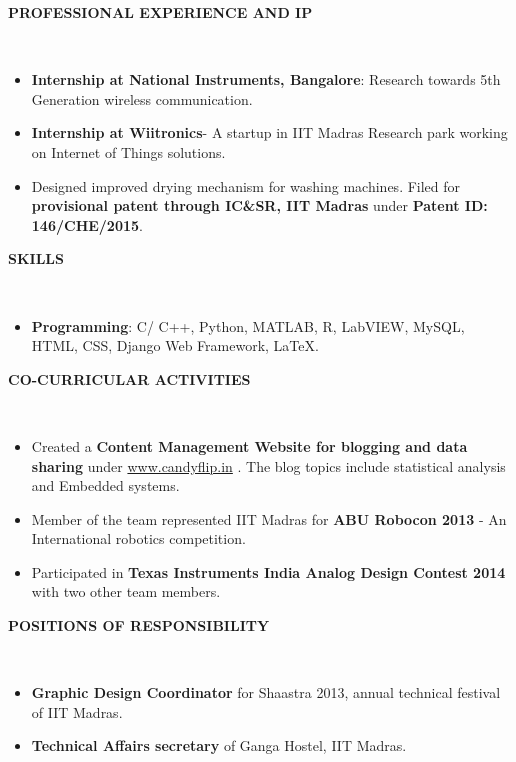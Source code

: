 \documentclass[a4paper,10pt]{article}
\newcommand{\lsep}{-0.5cm}
\newcommand{\resheading}[1]{{\small \colorbox{mygrey}{\begin{minipage}{0.975\textwidth}{\textbf{#1 \vphantom{p\^{E}}}}\end{minipage}}}}
\begin{document}
\resheading{\textbf{PROFESSIONAL EXPERIENCE AND IP} }\\[\lsep]
    \begin{itemize}
        \item \textbf{Internship at National Instruments, Bangalore}: Research towards 5th Generation wireless communication.\vspace{-5pt}        
        \item \textbf{Internship at Wiitronics}- A startup in IIT Madras Research park working on Internet of Things solutions. \vspace{-5pt}        
        \item Designed improved drying mechanism for washing machines. Filed for \textbf{provisional patent through IC\&SR, IIT Madras} under \textbf{Patent ID: 146/CHE/2015}.
    \end{itemize}
\resheading{\textbf{SKILLS} }\\[\lsep]
    \begin{itemize}
        \item \textbf{Programming}: C/ C++, Python, MATLAB, R, LabVIEW, MySQL, HTML, CSS, Django Web Framework, \LaTeX.
        \vspace{-5pt}
    \end{itemize}


\resheading{\textbf{CO-CURRICULAR ACTIVITIES} }\\[\lsep]
    \begin{itemize}
        \item Created a \textbf{Content Management Website for blogging and data sharing} under \hspace{3pt}\url{www.candyflip.in} . The blog topics include statistical analysis and Embedded systems.
        \vspace{-5pt}
        \item Member of the team represented IIT Madras for \textbf{ABU Robocon 2013} - An International robotics competition.
        \vspace{-5pt}
        \item Participated in \textbf{Texas Instruments India Analog Design Contest 2014} with two other team members.
    \end{itemize} 
\resheading{\textbf{POSITIONS OF RESPONSIBILITY} }\\[\lsep]
    \begin{itemize}
        \item \textbf{Graphic Design Coordinator} for Shaastra 2013, annual technical festival of 
        IIT Madras.
        \vspace{-5pt}
        \item \textbf{Technical Affairs secretary} of Ganga Hostel, IIT Madras.
    \end{itemize}
\end{document}

